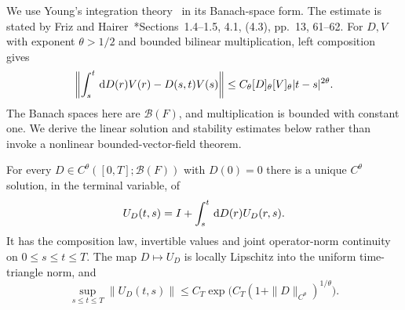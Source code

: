 We use Young's integration theory~\cite{young:36:inequality} in its
Banach-space form. The estimate is stated by
Friz and Hairer~\cite{friz.hairer:20:course}*{Sections~1.4--1.5, 4.1, (4.3), pp.~13, 61--62}.
For $D,V$ with exponent $\theta > 1/2$ and bounded bilinear multiplication, left
composition gives
\begin{equation}\label{E:constant-young-estimate}
  \left\|\int_s^t\,\mathrm{d} D(r)V(r)-D(s,t)V(s)\right\|
  \le C_\theta[D]_\theta[V]_\theta|t-s|^{2\theta}.
\end{equation}
The Banach spaces here are $\mathcal{B}(F)$, and multiplication is bounded with
constant one. We derive the linear solution and stability estimates below rather
than invoke a nonlinear bounded-vector-field theorem.

\begin{proposition}\label{P:constant-young-linear}
  For every $D \in C^\theta([0,T];\mathcal{B}(F))$ with $D(0) = 0$ there is a
  unique $C^\theta$ solution, in the terminal variable, of
  \begin{equation}\label{E:constant-young-equation}
    U_D(t,s)=I+\int_s^t\,\mathrm{d} D(r)U_D(r,s).
  \end{equation}
  It has the composition law, invertible values and joint operator-norm
  continuity on $0 \le s \le t \le T$. The map $D\mapsto U_D$ is locally
  Lipschitz into the uniform time-triangle norm, and
  \begin{equation}\label{E:constant-young-growth}
    \sup_{s\le t\le T}\|U_D(t,s)\|
    \le C_T\exp\big(C_T(1+\|D\|_{C^\theta})^{1/\theta}\big).
  \end{equation}
\end{proposition}

